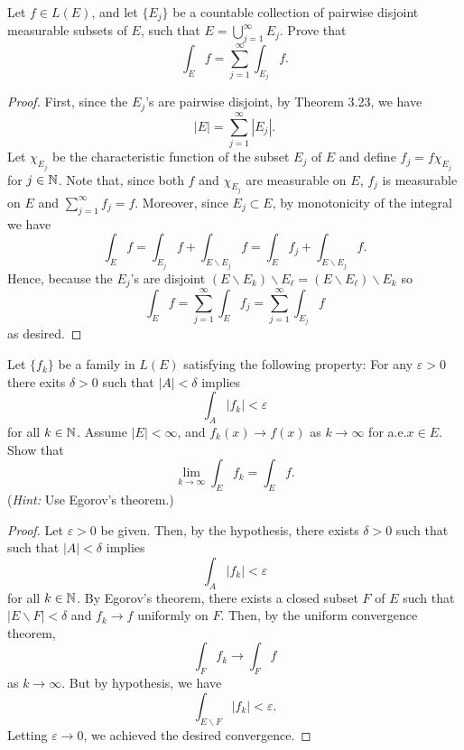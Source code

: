 \begin{problem}
Let $f\in L(E)$, and let $\{E_j\}$ be a countable collection of pairwise
disjoint measurable subsets of $E$, such that $E=\bigcup_{j=1}^\infty
E_j$. Prove that
\[
\int_E f=\sum_{j=1}^\infty\int_{E_j}f.
\]
\end{problem}
\begin{proof}
First, since the $E_j$'s are pairwise disjoint, by Theorem 3.23, we have
\begin{equation}
\label{eq:disjoint-measure-2-2}
|E|=\sum_{j=1}^\infty|E_j|.
\end{equation}
Let $\chi_{E_j}$ be the characteristic function of the subset $E_j$ of
$E$ and define $f_j= f\chi_{E_j}$ for $j\in\mathbb{N}$. Note that, since
both $f$ and $\chi_{E_j}$ are measurable on $E$, $f_j$ is
measurable on $E$ and $\sum_{j=1}^\infty f_j=f$. Moreover, since
$E_j\subset E$, by monotonicity of the integral we have
\begin{equation}
\label{eq:monotonicity-2-2}
\int_{E} f=
\int_{E_j} f+\int_{E\smallsetminus E_j}f=
\int_E f_j+\int_{E\smallsetminus E_j}f.
\end{equation}
Hence, because the $E_j$'s are disjoint $(E\smallsetminus E_k)\smallsetminus
E_\ell=(E\smallsetminus E_\ell)\smallsetminus E_k$ so
\begin{equation}
\label{eq:desired-sum-2}
\int_E f=\sum_{j=1}^\infty\int_E f_j=\sum_{j=1}^\infty\int_{E_j}f
\end{equation}
as desired.
\end{proof}

\begin{problem}
Let $\{f_k\}$ be a family in $L(E)$ satisfying the following property:
For any $\varepsilon>0$ there exits $\delta>0$ such that $|A|<\delta$
implies
\[
\int_A |f_k|<\varepsilon
\]
for all $k\in\mathbb{N}$. Assume $|E|<\infty$, and $f_k(x)\to f(x)$ as
$k\to\infty$ for a.e.\@ $x\in E$. Show that
\[
\lim_{k\to\infty}\int_E f_k=\int_E f.
\]
(\emph{Hint:} Use Egorov's theorem.)
\end{problem}
\begin{proof}
Let $\varepsilon>0$ be given. Then, by the hypothesis, there exists
$\delta>0$ such that
such that $|A|<\delta$
implies
\begin{equation}
  \label{eq:hypothesis-2-3}
\int_A |f_k|<\varepsilon
\end{equation}
for all $k\in\mathbb{N}$. By Egorov's theorem, there exists a closed subset $F$
of $E$ such that $|E\smallsetminus F|<\delta$ and $f_k\to f$ uniformly on
$F$. Then, by the uniform convergence theorem,
\begin{equation}
\label{eq:uniform-convergence-2-3}
\int_F f_k\longrightarrow \int_F f
\end{equation}
as $k\to\infty$. But by hypothesis, we have
\begin{equation}
\label{eq:need-to-show-2-}
\int_{E\smallsetminus F} |f_k|<\varepsilon.
\end{equation}
Letting $\varepsilon\to 0$, we achieved the desired convergence.
\end{proof}


